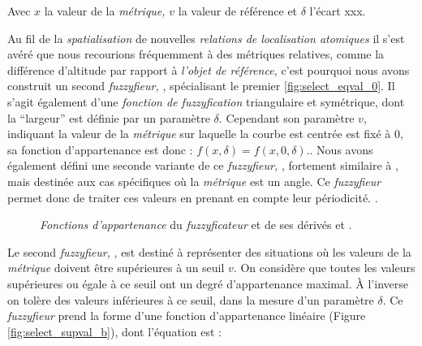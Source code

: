 Avec \(x\) la valeur de la \emph{métrique,} \(v\) la valeur de
référence et \(\delta\) l'écart xxx.

Au fil de la \emph{spatialisation} de nouvelles \emph{relations de
  localisation atomiques} il s'est avéré que nous recourions
fréquemment à des métriques relatives, comme la différence d'altitude
par rapport à \emph{l'objet de référence,} c'est pourquoi nous avons
construit un second \emph{fuzzyfieur,} , spécialisant le
premier \autoref{fig:select_eqval_0}. Il s'agit également d'une
\emph{fonction de fuzzyfication} triangulaire et symétrique, dont la
\enquote{largeur} est définie par un paramètre \(\delta\). Cependant
son paramètre \(v\), indiquant la valeur de la \emph{métrique} sur
laquelle la courbe est centrée est fixé à 0, sa fonction
d'appartenance est donc : \(f(x,\delta) = f(x,0,\delta)\).. Nous avons
également défini une seconde variante de ce \emph{fuzzyfieur,}
, fortement similaire à , mais destinée
aux cas spécifiques où la \emph{métrique} est un angle. Ce
\emph{fuzzyfieur} permet donc de traiter ces valeurs en prenant en
compte leur périodicité. .

\begin{figure}
  \centering
  
  \hfill  
  \caption{\emph{Fonctions d'appartenance} du \emph{fuzzyficateur}
    \protect{} et de ses dérivés \protect{}
    et \protect{}.}
  \label{fig:select_eqval}
\end{figure}

Le second \emph{fuzzyfieur,} , est destiné à
représenter des situations où les valeurs de la \emph{métrique}
doivent être supérieures à un seuil \(v\). On considère que toutes les
valeurs supérieures ou égale à ce seuil ont un degré d'appartenance
maximal. À l'inverse on tolère des valeurs inférieures à ce seuil,
dans la mesure d'un paramètre \(\delta\). Ce \emph{fuzzyfieur} prend
la forme d'une fonction d'appartenance linéaire (Figure
\ref{fig:select_supval_b}), dont l'équation est :

